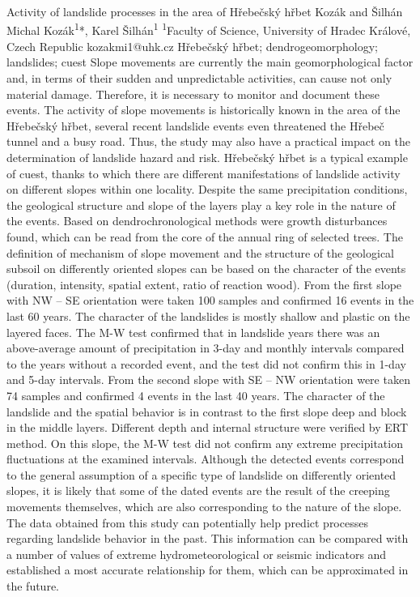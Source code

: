 \abstract
{Activity of landslide processes in the area of Hřebečský hřbet} 
{Kozák and Šilhán} 
{Michal Kozák\textsuperscript{1}*, Karel Šilhán\textsuperscript{1}} 
{\POtag} 
{
\textsuperscript{1}Faculty of Science, University of Hradec Králové, Czech Republic
}
{kozakmi1@uhk.cz}  %
{Hřebečský hřbet; dendrogeomorphology; landslides; cuest}
{Slope movements are currently the main geomorphological factor and, in terms of their sudden and unpredictable activities, can cause not only material damage. Therefore, it is necessary to monitor and document these events. The activity of slope movements is historically known in the area of the Hřebečský hřbet, several recent landslide events even threatened the Hřebeč tunnel and a busy road. Thus, the study may also have a practical impact on the determination of landslide hazard and risk. Hřebečský hřbet is a typical example of cuest, thanks to which there are different manifestations of landslide activity on different slopes within one locality. Despite the same precipitation conditions, the geological structure and slope of the layers play a key role in the nature of the events. Based on dendrochronological methods were growth disturbances found, which can  be read from the core of the annual ring of selected trees. The definition of mechanism of slope movement and the structure of the geological subsoil on differently oriented slopes can be based on the character of the events (duration, intensity, spatial extent, ratio of reaction wood). From the first slope with NW -- SE orientation were taken 100 samples and confirmed 16 events in the last 60 years. The character of the landslides is mostly shallow and plastic on the layered faces. The M-W test confirmed that in landslide years there was an above-average amount of precipitation in 3-day and monthly intervals compared to the years without a recorded event, and the test did not confirm this in 1-day and 5-day intervals. From the second slope with SE -- NW orientation were taken 74 samples and confirmed 4 events in the last 40 years. The character of the landslide and the spatial behavior is in contrast to the first slope deep and block in the middle layers. Different depth and internal structure were verified by ERT method. On this slope, the M-W test did not confirm any extreme precipitation fluctuations at the examined intervals. Although the detected events correspond to the general assumption of a specific type of landslide on differently oriented slopes, it is likely that some of the dated events are the result of the creeping movements themselves, which are also corresponding to the nature of the slope. The data obtained from this study can potentially help predict processes regarding landslide behavior in the past. This information can be compared with a number of values of extreme hydrometeorological or seismic indicators and  established a most accurate relationship for them, which can be approximated in the future.
}
